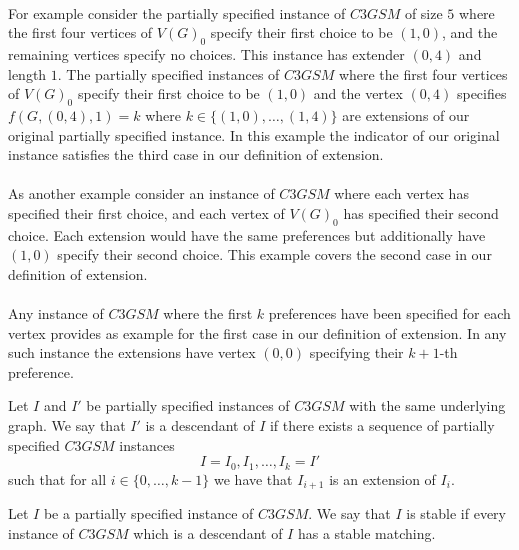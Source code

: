 \paragraph{}
For example consider the partially specified instance of $C3GSM$ of size $5$ where the first four vertices of $V(G)_0$ specify their first choice to be $(1,0)$, and the remaining vertices specify no choices. This instance has extender $(0,4)$ and length $1$. The partially specified instances of $C3GSM$ where the first four vertices of $V(G)_0$ specify their first choice to be $(1,0)$ and the vertex $(0,4)$ specifies $f(G,(0,4),1) = k$ where $k \in \{(1,0), \dots, (1,4)\}$ are extensions of our original partially specified instance. In this example the indicator of our original instance satisfies the third case in our definition of extension. 
\paragraph{}
As another example consider an instance of $C3GSM$ where each vertex has specified their first choice, and each vertex of $V(G)_0$ has specified their second choice. Each extension would have the same preferences but additionally have $(1,0)$ specify their second choice. This example covers the second case in our definition of extension. 
\paragraph{}
Any instance of $C3GSM$ where the first $k$ preferences have been specified for each vertex provides as example for the first case in our definition of extension. In any such instance the extensions have vertex $(0,0)$ specifying their $k+1$-th preference.
\begin{definition}
Let $I$ and $I'$ be partially specified instances of $C3GSM$ with the same underlying graph. We say that $I'$ is a descendant of $I$ if there exists a sequence of partially specified $C3GSM$ instances
$$I = I_0, I_1, \dots, I_k=I'$$
such that for all $i \in \{0,\dots, k-1\}$ we have that $I_{i+1}$ is an extension of $I_i$.
\end{definition}
\begin{definition}
Let $I$ be a partially specified instance of $C3GSM$. We say that $I$ is stable if every instance of $C3GSM$ which is a descendant of $I$ has a stable matching.
\end{definition}
